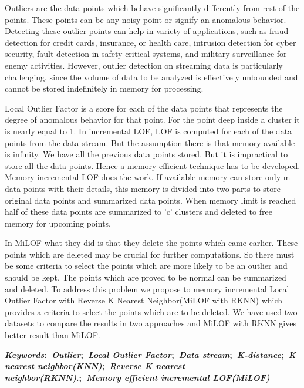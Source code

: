\thispagestyle{empty} 
\noindent 

Outliers are the data points which behave significantly differently from rest of the points. These points can be any noisy point or signify an anomalous behavior. Detecting these outlier points can help in variety of applications, such as fraud detection for credit cards, insurance, or health care, intrusion detection
for cyber security, fault detection in safety critical systems, and military surveillance
for enemy activities. However, outlier detection on streaming data is particularly
challenging, since the volume of data to be analyzed is
effectively unbounded and cannot be stored indefinitely in
memory for processing. 

Local Outlier Factor is a score for each of the data points that represents the degree of anomalous behavior for that point. For the point deep inside a cluster it is nearly equal to 1. In incremental LOF, LOF is computed for each of the data points from the data stream. But the assumption there is that memory available is infinity. We have all the previous data points stored. But it is impractical to store all the data points. Hence a memory efficient technique has to be developed. Memory incremental LOF does the work. If available memory can store only m data points with their details, this memory is divided into two parts to store original data points and summarized data points.  When memory limit is reached half of these data points are summarized to 'c' clusters and deleted to free memory for upcoming points.

 

\par

\par 
In MiLOF what they did is that they delete the points which came earlier. These points which are deleted may be crucial for further computations. So there must be some criteria to select the points which are more likely to be an outlier and should be kept. The points which are proved to be normal can be summarized and deleted. To address this problem we propose to memory incremental Local Outlier Factor with Reverse K Nearest Neighbor(MiLOF with RKNN) which provides a criteria to select the points which are to be deleted. We have used two datasets to compare the results in two approaches and MiLOF with RKNN gives better result than MiLOF.

  


\vspace{5mm}
\noindent\textbf{\textit{Keywords}:~\textit{Outlier};~\textit{Local Outlier Factor};~\textit{Data stream};~\textit{K-distance};~\textit{K nearest neighbor(KNN)};~\textit{Reverse K nearest neighbor(RKNN)}.;~\textit{Memory efficient incremental LOF(MiLOF)}}
